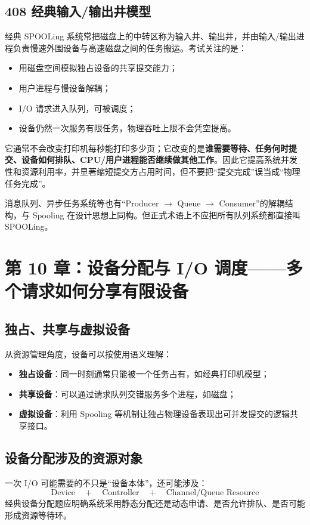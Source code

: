 \documentclass[UTF8,fontset=fandol,11pt,a4paper]{ctexart}
\newcommand{\kw}[1]{\textbf{#1}}
\begin{document}
\subsection{408 经典输入/输出井模型}
经典 SPOOLing 系统常把磁盘上的中转区称为输入井、输出井，并由输入/输出进程负责慢速外围设备与高速磁盘之间的任务搬运。考试关注的是：
\begin{itemize}
  \item 用磁盘空间模拟独占设备的共享提交能力；
  \item 用户进程与慢设备解耦；
  \item I/O 请求进入队列，可被调度；
  \item 设备仍然一次服务有限任务，物理吞吐上限不会凭空提高。
\end{itemize}

\begin{warn}
它通常不会改变打印机每秒能打印多少页；它改变的是\kw{谁需要等待、任务何时提交、设备如何排队、CPU/用户进程能否继续做其他工作}。因此它提高系统并发性和资源利用率，并显著缩短提交方占用时间，但不要把“提交完成”误当成“物理任务完成”。
\end{warn}

\begin{eng}
消息队列、异步任务系统等也有“Producer $\to$ Queue $\to$ Consumer”的解耦结构，与 Spooling 在设计思想上同构。但正式术语上不应把所有队列系统都直接叫 SPOOLing。
\end{eng}

\section{第 10 章：设备分配与 I/O 调度——多个请求如何分享有限设备}

\subsection{独占、共享与虚拟设备}
从资源管理角度，设备可以按使用语义理解：
\begin{itemize}
  \item \kw{独占设备}：同一时刻通常只能被一个任务占有，如经典打印机模型；
  \item \kw{共享设备}：可以通过请求队列交错服务多个进程，如磁盘；
  \item \kw{虚拟设备}：利用 Spooling 等机制让独占物理设备表现出可并发提交的逻辑共享接口。
\end{itemize}

\subsection{设备分配涉及的资源对象}
一次 I/O 可能需要的不只是“设备本体”，还可能涉及：
\[
\text{Device}\quad+\quad\text{Controller}\quad+\quad\text{Channel/Queue Resource}
\]
经典设备分配题应明确系统采用静态分配还是动态申请、是否允许排队、是否可能形成资源等待环。
\end{document}
